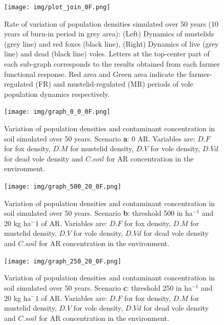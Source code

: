 \documentclass[11pt]{article}
\begin{document}
\begin{figure}[!htb]
	\begin{center}
		\texttt{[image: img/plot\_join\_0F.png]}
		\caption{Rate of variation of population densities simulated over 50 years (10 years of burn-in period in grey area): (Left) Dynamics of mustelids (grey line) and red foxes (black line), (Right) Dynamics of live (grey line) and dead (black line) voles. Letters at the top-center part of each sub-graph corresponds to the results obtained from each farmer functional response. Red area and Green area indicate the farmer-regulated (FR) and mustelid-regulated (MR) periods of vole population dynamics respectively.}
		\label{fig:populations}
	\end{center}
\end{figure}

\begin{figure}[!htb]
	\begin{center}
		\texttt{[image: img/graph\_0\_0\_0F.png]}
		\caption{Variation of population densities and contaminant concentration in soil simulated over 50 years. Scenario \textbf{a}: 0 AR. Variables are: $D.F$ for fox density, $D.M$ for mustelid density, $D.V$ for vole density, $D.Vd$ for dead vole density and $C.soil$ for AR concentration in the environment.}
	\end{center}
\end{figure}

\begin{figure}[!htb]
	\begin{center}
		\texttt{[image: img/graph\_500\_20\_0F.png]}
		\caption{Variation of population densities and contaminant concentration in soil simulated over 50 years. Scenario \textbf{b}: threshold 500 in ha$^{-1}$ and 20 kg ha$^-1$ of AR. Variables are: $D.F$ for fox density, $D.M$ for mustelid density, $D.V$ for vole density, $D.Vd$ for dead vole density and $C.soil$ for AR concentration in the environment.}
	\end{center}
\end{figure}

\begin{figure}[!htb]
	\begin{center}
		\texttt{[image: img/graph\_250\_20\_0F.png]}
		\caption{Variation of population densities and contaminant concentration in soil simulated over 50 years. Scenario \textbf{c}: threshold 250 in ha$^{-1}$ and 20 kg ha$^-1$ of AR. Variables are: $D.F$ for fox density, $D.M$ for mustelid density, $D.V$ for vole density, $D.Vd$ for dead vole density and $C.soil$ for AR concentration in the environment.}
	\end{center}
\end{figure}
\end{document}
